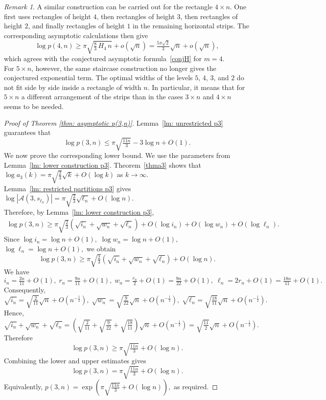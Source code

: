 \documentclass[12pt,a4paper]{amsart}
\numberwithin{equation}{section}
\theoremstyle{plain}
\theoremstyle{definition}
\theoremstyle{remark}
\newtheorem{re}[thm]{Remark}
\begin{document}
\begin{re}
A similar construction can be carried out for the rectangle $4\times n$. One first uses rectangles of height $4$, then rectangles of height $3$, then rectangles of height $2$, and finally rectangles of height $1$ in the remaining horizontal strips. The corresponding asymptotic calculations then give
$$
\log p(4,n)
\ge
\pi\sqrt{\tfrac{8}{3}\,H_4\,n}+o(\sqrt n)
=
\tfrac{5\pi\sqrt2}{3}\sqrt n+o(\sqrt n),
$$
which agrees with the conjectured asymptotic formula~\eqref{conjH} for $m=4$.\\
For $5\times n$, however, the same staircase construction no longer gives the conjectured exponential term. The optimal widths of the levels $5$, $4$, $3$, and $2$ do not fit side by side inside a rectangle of width $n$. In particular, it means that for $5\times n$ a different arrangement of the strips than in the cases $3\times n$ and $4\times n$ seems to be needed.
\end{re}
\begin{proof}[Proof of Theorem \ref{thm: asymptotic p(3,n)}]
Lemma~\ref{lm: unrestricted p3} guarantees that
$$
\log p(3,n)
\le 
\pi\sqrt{\tfrac{11n}{3}}
-3\log n
+O(1).
$$
We now prove the corresponding lower bound. We use the parameters from Lemma~\ref{lm: lower construction p3}. Theorem~\ref{thma3} shows that
$
\log a_3(k)=\pi\sqrt{\tfrac23}\sqrt k+O(\log k)
$
as $k\to\infty$.\\ Lemma~\ref{lm: restricted partitions p3} gives
$
\log|\mathcal A(3,s_{\ell_n})|=\pi\sqrt{\tfrac23}\sqrt{\ell_n}+O(\log n).
$\\
Therefore, by Lemma~\ref{lm: lower construction p3},
\begin{align*}
\log p(3,n)\ge\pi\sqrt{\tfrac23}
\left(\sqrt{i_n}+\sqrt{w_n}+\sqrt{\ell_n}\right)
+O(\log i_n)+O(\log w_n)+O(\log\ell_n).
\end{align*}
Since
$
\log i_n=\log n+O(1),$
 $\log w_n=\log n+O(1),$
 $\log\ell_n=\log n+O(1),$
we obtain
$$
\log p(3,n)
\ge
\pi\sqrt{\tfrac23}
\left(
\sqrt{i_n}
+
\sqrt{w_n}
+
\sqrt{\ell_n}
\right)
+
O(\log n).
$$
We have
$$
i_n=\tfrac{2n}{11}+O(1),\;
r_n=\tfrac{9n}{11}+O(1),\;
w_n=\tfrac{r_n}{2}+O(1)=\tfrac{9n}{22}+O(1),\;
\ell_n=2r_n+O(1)=\tfrac{18n}{11}+O(1).
$$
Consequently,
$$
\sqrt{i_n}
=
\sqrt{\tfrac{2}{11}}\sqrt n+O(n^{-\frac{1}{2}}),\;
\sqrt{w_n}
=
\sqrt{\tfrac{9}{22}}\sqrt n+O(n^{-\frac{1}{2}}),\;
\sqrt{\ell_n}
=
\sqrt{\tfrac{18}{11}}\sqrt n+O(n^{-\frac{1}{2}}).
$$
Hence,
$$
\sqrt{i_n}+\sqrt{w_n}+\sqrt{\ell_n}
=
\left(
\sqrt{\tfrac{2}{11}}
+
\sqrt{\tfrac{9}{22}}
+
\sqrt{\tfrac{18}{11}}
\right)\sqrt n
+
O(n^{-\frac{1}{2}})
=
\sqrt{\tfrac{11}{2}}\sqrt n
+
O(n^{-\frac{1}{2}}).
$$
Therefore
$$
\log p(3,n)\ge\pi\sqrt{\tfrac{11n}{3}}+O(\log n).
$$
Combining the lower and upper estimates gives
$$
\log p(3,n)=\pi\sqrt{\tfrac{11n}{3}}+O(\log n).
$$
Equivalently,
$p(3,n)=\exp\left(\pi\sqrt{\tfrac{11n}{3}}+O(\log n)\right),
$ as required.
\end{proof}
\end{document}
